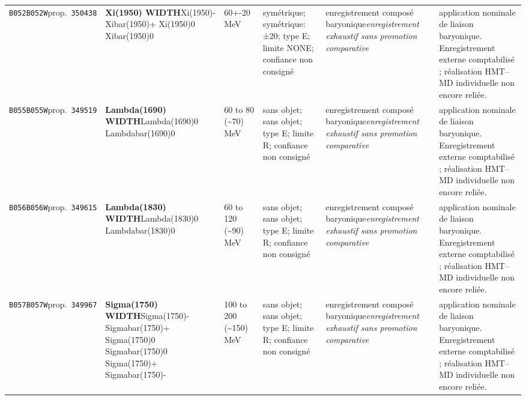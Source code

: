 \begin{landscape}
\begin{longtable}{L{1.85cm}L{4.45cm}L{2.35cm}L{4.05cm}L{3.35cm}L{7.15cm}}
\texttt{B052}\newline \texttt{B052W}\newline prop.\ \texttt{350438} & \textbf{Xi(1950) WIDTH}\newline Xi(1950)- \textbar{}\allowbreak{} Xibar(1950)+ \textbar{}\allowbreak{} Xi(1950)0 \textbar{}\allowbreak{} Xibar(1950)0 & 60+-20\,MeV & symétrique; symétrique: ±20; type E; limite NONE; confiance non consigné & enregistrement composé baryonique\newline \emph{enregistrement exhaustif sans promotion comparative} & application nominale de liaison baryonique. Enregistrement externe comptabilisé ; réalisation HMT--MD individuelle non encore reliée. \\
\texttt{B055}\newline \texttt{B055W}\newline prop.\ \texttt{349519} & \textbf{Lambda(1690) WIDTH}\newline Lambda(1690)0 \textbar{}\allowbreak{} Lambdabar(1690)0 & 60 to 80 (\textasciitilde{}70)\,MeV & sans objet; sans objet; type E; limite R; confiance non consigné & enregistrement composé baryonique\newline \emph{enregistrement exhaustif sans promotion comparative} & application nominale de liaison baryonique. Enregistrement externe comptabilisé ; réalisation HMT--MD individuelle non encore reliée. \\
\texttt{B056}\newline \texttt{B056W}\newline prop.\ \texttt{349615} & \textbf{Lambda(1830) WIDTH}\newline Lambda(1830)0 \textbar{}\allowbreak{} Lambdabar(1830)0 & 60 to 120 (\textasciitilde{}90)\,MeV & sans objet; sans objet; type E; limite R; confiance non consigné & enregistrement composé baryonique\newline \emph{enregistrement exhaustif sans promotion comparative} & application nominale de liaison baryonique. Enregistrement externe comptabilisé ; réalisation HMT--MD individuelle non encore reliée. \\
\texttt{B057}\newline \texttt{B057W}\newline prop.\ \texttt{349967} & \textbf{Sigma(1750) WIDTH}\newline Sigma(1750)- \textbar{}\allowbreak{} Sigmabar(1750)+ \textbar{}\allowbreak{} Sigma(1750)0 \textbar{}\allowbreak{} Sigmabar(1750)0 \textbar{}\allowbreak{} Sigma(1750)+ \textbar{}\allowbreak{} Sigmabar(1750)- & 100 to 200 (\textasciitilde{}150)\,MeV & sans objet; sans objet; type E; limite R; confiance non consigné & enregistrement composé baryonique\newline \emph{enregistrement exhaustif sans promotion comparative} & application nominale de liaison baryonique. Enregistrement externe comptabilisé ; réalisation HMT--MD individuelle non encore reliée. \\

\end{longtable}
\end{landscape}
